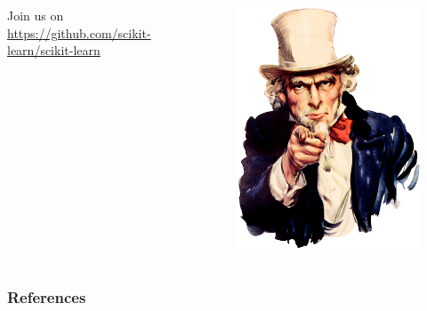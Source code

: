 \documentclass{beamer}
\begin{document}
\begin{frame}
    \begin{columns}
    \begin{column}{0.5\textwidth}

    Join us on \url{https://github.com/scikit-learn/scikit-learn}

    \end{column}
    \begin{column}{0.5\textwidth}
      \begin{figure}
      \includegraphics[width=\textwidth]{./figures/we_want_you.png}
      \end{figure}
    \end{column}
    \end{columns}
\end{frame}

\begin{frame}
    \frametitle{References}
    {\footnotesize
    
    }
\end{frame}
\end{document}
